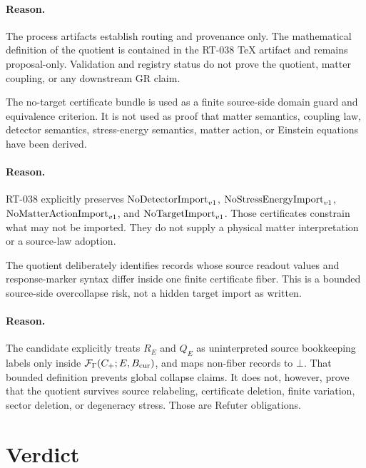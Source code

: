 \paragraph{Reason.}
The process artifacts establish routing and provenance only. The mathematical
definition of the quotient is contained in the RT-038 TeX artifact and remains
proposal-only. Validation and registry status do not prove the quotient,
matter coupling, or any downstream GR claim.

\begin{proposition}
The no-target certificate bundle is used as a finite source-side domain guard
and equivalence criterion. It is not used as proof that matter semantics,
coupling law, detector semantics, stress-energy semantics, matter action, or
Einstein equations have been derived.
\end{proposition}

\paragraph{Reason.}
RT-038 explicitly preserves \(\mathrm{NoDetectorImport}_{v1}\), \(\mathrm{NoStressEnergyImport}_{v1}\), \(\mathrm{NoMatterActionImport}_{v1}\), and
\(\mathrm{NoTargetImport}_{v1}\). Those certificates constrain what may not be imported. They do
not supply a physical matter interpretation or a source-law adoption.

\begin{proposition}
The quotient deliberately identifies records whose source readout values and
response-marker syntax differ inside one finite certificate fiber. This is a
bounded source-side overcollapse risk, not a hidden target import as written.
\end{proposition}

\paragraph{Reason.}
The candidate explicitly treats \(R_E\) and \(Q_E\) as uninterpreted source
bookkeeping labels only inside \(\mathcal F_{\Gamma}(C_+;E,B_{\mathrm{cur}})\), and maps
non-fiber records to \(\bot\). That bounded definition prevents global
collapse claims. It does not, however, prove that the quotient survives
source relabeling, certificate deletion, finite variation, sector deletion,
or degeneracy stress. Those are Refuter obligations.

\section{Verdict}

